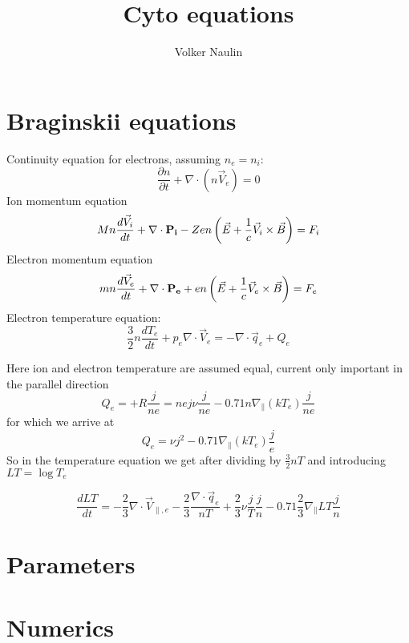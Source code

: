 \documentclass[11pt]{article} %
\title{Cyto equations}
\author{Volker Naulin}
\begin{document}
\maketitle

\section{Braginskii equations}
Continuity equation for electrons, assuming $n_e = n_i$:
\begin{equation}
\frac{\partial n}{\partial t} + \nabla \cdot (n \vec V_{e}) = 0
\end{equation}
Ion momentum equation
\begin{equation}
M n \frac{d \vec V_{i}}{d t} + \nabla\cdot {\bf P_{i}} 
- Z e n \left( \vec E + \frac{1}{c} \vec V_{i} \times \vec B\right) = F_{i}
\end{equation}
Electron momentum equation
\begin{equation}
m n \frac{d \vec V_{e}}{d t} + \nabla\cdot {\bf P_{e}} 
+ e n \left( \vec E + \frac{1}{c} \vec V_{e} \times \vec B\right) = F_{e}
\end{equation}
Electron temperature equation:
\begin{equation}
\frac{3}{2} n  \frac{d  T_{e}}{d t} + p_e \nabla\cdot \vec V_{e} =  
-\nabla \cdot \vec q_e + Q_e
\end{equation}

Here ion and electron temperature are assumed equal, current only important in the parallel direction
$$
Q_e = +R \frac{j}{ne} = n e j \nu \frac{j}{ne} -0.71 n \nabla_\|(kT_e)  \frac{j}{ne}
$$
for which we arrive at 
$$
Q_e  = \nu j^2 -0.71  \nabla_\|(kT_e)  \frac{j}{e}
$$
So in the temperature equation we get after dividing by $\frac{3}{2} nT$ and introducing $LT = \log T_e$

\begin{equation}
\frac{d  LT}{d t} =-\frac{2}{3} \nabla\cdot \vec V_{\|,e}   
-\frac{2}{3} \frac{\nabla \cdot \vec q_e}{nT} +\frac{2}{3}  \nu \frac{j}{T}\frac{j}{n} -0.71 \frac{2}{3}  \nabla_\| LT  \frac{j}{n}
\end{equation}

\section{Parameters}

\section{Numerics}
\end{document}
